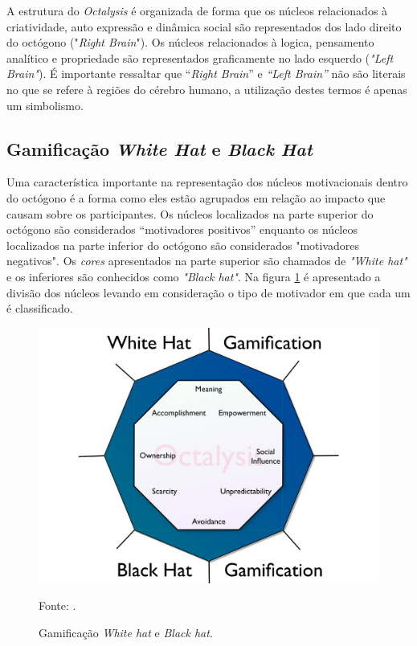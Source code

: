 A estrutura do \textit{Octalysis} é organizada de forma que os núcleos relacionados à criatividade, auto expressão e dinâmica social são
representados dos lado direito do octógono ("\textit{Right Brain}"). Os núcleos relacionados à logica, pensamento analítico e propriedade são representados graficamente
no lado esquerdo (\textit{"Left Brain"}). É importante ressaltar que ``\textit{Right Brain}'' e \textit{``Left Brain''} não são literais no que se refere
à regiões do cérebro humano, a utilização destes termos é apenas um simbolismo.

\subsection{Gamificação \textit{White Hat} e \textit{Black Hat}}

Uma característica importante na representação dos núcleos motivacionais dentro do octógono é a forma como eles estão agrupados em relação ao impacto
que causam sobre os participantes. Os núcleos localizados na parte superior do octógono são considerados ``motivadores positivos'' enquanto os núcleos localizados
na parte inferior do octógono são considerados "motivadores negativos". Os \textit{cores} apresentados na parte superior são chamados de \textit{"White hat"} e os inferiores
são conhecidos como \textit{"Black hat"}. Na figura \ref{octogono} é apresentado a divisão dos núcleos levando em consideração o tipo de motivador em que cada um
é classificado.

\begin{figure}[h]
	\centering
	\includegraphics[keepaspectratio=true,scale=0.28]{figuras/octogono.jpg}
	\caption{Gamificação \textit{White hat} e \textit{Black hat}.}
	Fonte: \cite{chou2017actionable}.
	\label{octogono}
\end{figure}

